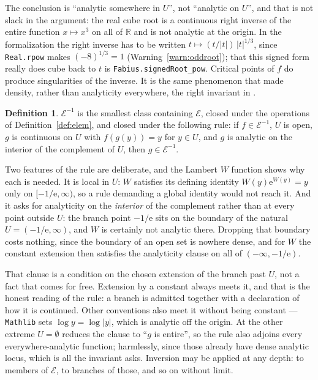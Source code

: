 \documentclass[11pt,oneside]{article}
\theoremstyle{definition}
\newtheorem{definition}[theorem]{Definition}
\theoremstyle{remark}
\newcommand{\R}{\mathbb R}
\newcommand{\e}{\mathrm e}
\newcommand{\Elem}{\mathcal E}
\begin{document}
The conclusion is ``analytic somewhere in $U$'', not ``analytic on $U$'', and
that is not slack in the argument: the real cube root is a continuous right
inverse of the entire function $x\mapsto x^3$ on all of $\R$ and is not
analytic at the origin.  In the formalization the right inverse has to be
written $t\mapsto(t/|t|)\,|t|^{1/3}$, since \texttt{Real.rpow} makes
$(-8)^{1/3}=1$ (Warning~\ref{warn:oddroot}); that this signed form really does
cube back to $t$ is \texttt{Fabius.signedRoot\_pow}.  Critical points of $f$
do produce singularities of the inverse.  It is the same phenomenon that made
density, rather than analyticity everywhere, the right invariant in
.

\begin{definition}\label{def:elemplus}
$\Elem^{-1}$ is the smallest class containing $\Elem$, closed under the
operations of Definition~\ref{def:elem}, and closed under the following rule: if
$f\in\Elem^{-1}$, $U$ is open, $g$ is continuous on $U$ with $f(g(y))=y$ for
$y\in U$, and $g$ is analytic on the interior of the complement of $U$, then
$g\in\Elem^{-1}$.
\end{definition}

Two features of the rule are deliberate, and the Lambert $W$ function shows
why each is needed.  It is local in $U$: $W$ satisfies its defining identity
$W(y)\e^{W(y)}=y$ only on $[-1/\e,\infty)$, so a rule demanding a global
identity would not reach it.  And it asks for analyticity on the
\emph{interior} of the complement rather than at every point outside $U$: the
branch point $-1/\e$ sits on the boundary of the natural $U=(-1/\e,\infty)$,
and $W$ is certainly not analytic there.  Dropping that boundary costs
nothing, since the boundary of an open set is nowhere dense, and for $W$ the
constant extension then satisfies the analyticity clause on all of
$(-\infty,-1/\e)$.

That clause is a condition on the chosen extension of the branch past $U$, not
a fact that comes for free.  Extension by a constant always meets it, and that
is the honest reading of the rule: a branch is admitted together with a
declaration of how it is continued.  Other conventions also meet it without
being constant --- \texttt{Mathlib} sets $\log y=\log|y|$, which is analytic
off the origin.  At the other extreme $U=\emptyset$ reduces the clause to
``$g$ is entire'', so the rule also adjoins every everywhere-analytic
function; harmlessly, since those already have dense analytic locus, which is
all the invariant asks.  Inversion may be applied at any depth: to members of
$\Elem$, to branches of those, and so on without limit.
\end{document}
